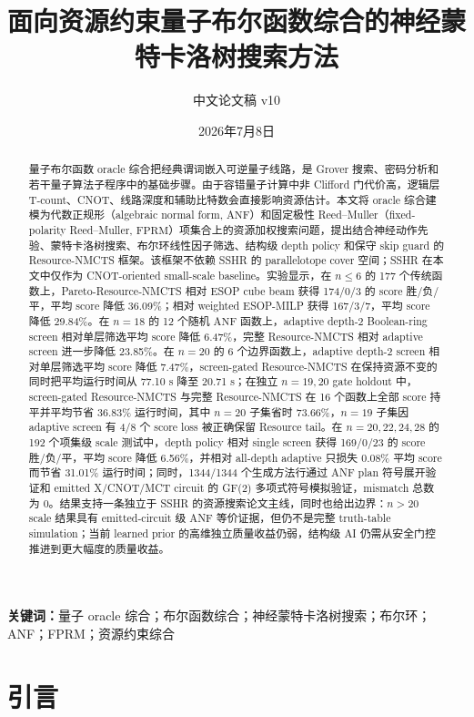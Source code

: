 \documentclass[UTF8,fontset=macnew,11pt]{ctexart}
\title{面向资源约束量子布尔函数综合的神经蒙特卡洛树搜索方法}
\author{中文论文稿 v10}
\date{2026年7月8日}
\newcommand{\method}{Resource-NMCTS}
\newcommand{\pareto}{Pareto-Resource-NMCTS}
\newcommand{\screen}{Boolean-ring screen}
\newcommand{\anf}{\ensuremath{\mathrm{ANF}}}
\newcommand{\fprm}{\ensuremath{\mathrm{FPRM}}}
\begin{document}
\pagestyle{plain}
\maketitle

\begin{abstract}
量子布尔函数 oracle 综合把经典谓词嵌入可逆量子线路，是 Grover 搜索、密码分析和若干量子算法子程序中的基础步骤。由于容错量子计算中非 Clifford 门代价高，逻辑层 T-count、CNOT、线路深度和辅助比特数会直接影响资源估计。本文将 oracle 综合建模为代数正规形（algebraic normal form, \anf{}）和固定极性 Reed--Muller（fixed-polarity Reed--Muller, \fprm{}）项集合上的资源加权搜索问题，提出结合神经动作先验、蒙特卡洛树搜索、布尔环线性因子筛选、结构级 depth policy 和保守 skip guard 的 \method{} 框架。该框架不依赖 SSHR 的 parallelotope cover 空间；SSHR 在本文中仅作为 CNOT-oriented small-scale baseline。实验显示，在 $n\leq6$ 的 177 个传统函数上，\pareto{} 相对 ESOP cube beam 获得 174/0/3 的 score 胜/负/平，平均 score 降低 36.09\%；相对 weighted ESOP-MILP 获得 167/3/7，平均 score 降低 29.84\%。在 $n=18$ 的 12 个随机 \anf{} 函数上，adaptive depth-2 \screen{} 相对单层筛选平均 score 降低 6.47\%，完整 \method{} 相对 adaptive screen 进一步降低 23.85\%。在 $n=20$ 的 6 个边界函数上，adaptive depth-2 screen 相对单层筛选平均 score 降低 7.47\%，screen-gated \method{} 在保持资源不变的同时把平均运行时间从 77.10 s 降至 20.71 s；在独立 $n=19,20$ gate holdout 中，screen-gated \method{} 与完整 \method{} 在 16 个函数上全部 score 持平并平均节省 36.83\% 运行时间，其中 $n=20$ 子集省时 73.66\%，$n=19$ 子集因 adaptive screen 有 4/8 个 score loss 被正确保留 Resource tail。在 $n=20,22,24,28$ 的 192 个项集级 scale 测试中，depth policy 相对 single screen 获得 169/0/23 的 score 胜/负/平，平均 score 降低 6.56\%，并相对 all-depth adaptive 只损失 0.08\% 平均 score 而节省 31.01\% 运行时间；同时，1344/1344 个生成方法行通过 ANF plan 符号展开验证和 emitted X/CNOT/MCT circuit 的 GF(2) 多项式符号模拟验证，mismatch 总数为 0。结果支持一条独立于 SSHR 的资源搜索论文主线，同时也给出边界：$n>20$ scale 结果具有 emitted-circuit 级 ANF 等价证据，但仍不是完整 truth-table simulation；当前 learned prior 的高维独立质量收益仍弱，结构级 AI 仍需从安全门控推进到更大幅度的质量收益。
\end{abstract}

\noindent\textbf{关键词：}量子 oracle 综合；布尔函数综合；神经蒙特卡洛树搜索；布尔环；ANF；FPRM；资源约束综合

\section{引言}
\end{document}
